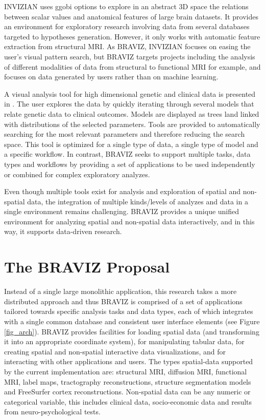 \documentclass[utf8,paper]{frontiersSCNS} %
\begin{document}
INVIZIAN \citep{bowman_query-based_2011,bowman_feature-similarity_2012,bowman_visual_2012} uses ggobi options to explore in an abstract 3D space the relations between scalar values and anatomical features of large brain datasets. It provides an environment for exploratory research involving data from several databases targeted to hypotheses generation. However, it only works with automatic feature extraction from structural MRI. As BRAVIZ, INVIZIAN focuses on easing the user’s visual pattern search, but BRAVIZ targets projects including the analysis of different modalities of data from structural to functional MRI for example, and focuses on data generated by users rather than on machine learning. 


A visual analysis tool for high dimensional genetic and clinical data is presented in \citep{hinterberg_peax:_2014}. The user explores the data by quickly iterating through several models that relate genetic data to clinical outcomes. Models are displayed as trees land linked with distributions of the selected parameters. Tools are provided to automatically searching for the most relevant parameters and therefore reducing the search space. This tool is optimized for a single type of data, a single type of model and a specific workflow. In contrast, BRAVIZ seeks to support multiple tasks, data types and workflows by providing a set of  applications to be used independently or combined for complex exploratory analyzes.
	
Even though multiple tools  exist for analysis and exploration of spatial and non-spatial data, the integration of multiple kinds/levels of analyzes and data in a single environment remains challenging. BRAVIZ provides a unique unified environment for analyzing spatial and non-spatial data interactively, and in this way, it supports data-driven research.

\section{The BRAVIZ Proposal}

Instead of a single large monolithic application, this research takes a more distributed approach and thus BRAVIZ is comprised of a set of applications tailored towards specific analysis tasks and data types, each of which integrates with a single common database and consistent user interface elements (see Figure \ref{fig_arch}). BRAVIZ provides facilities for loading spatial data (and transforming it into an appropriate coordinate system), for manipulating tabular data, for creating spatial and non-spatial interactive data visualizations, and for interacting with other applications and users. The types spatial-data supported by the current implementation are: structural MRI, diffusion MRI, functional MRI, label maps, tractography reconstructions, structure segmentation models and FreeSurfer cortex reconstructions. Non-spatial data can be any numeric or categorical variable, this includes clinical data, socio-economic data and results from neuro-psychological tests.
\end{document}
